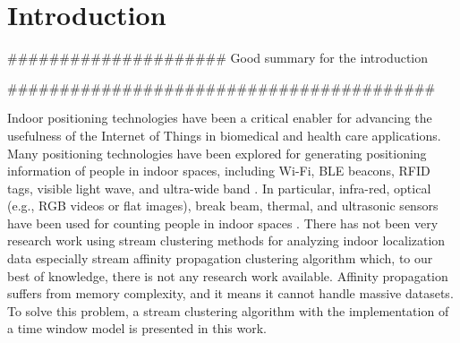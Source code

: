 \setlength{\parindent}{2em}
% 
\chapter{Introduction}

#####################
Good summary for the introduction

#########################################

Indoor positioning technologies have been a critical enabler for advancing the usefulness of the Internet of Things in biomedical and health care applications. Many positioning technologies have been explored for generating positioning information of people in indoor spaces, including Wi-Fi, BLE beacons, RFID tags, visible light wave, and ultra-wide band \cite{namiot2015indoor, jeon2018ble}. In particular, infra-red, optical (e.g., RGB videos or flat images), break beam, thermal, and ultrasonic sensors have been used for counting people in indoor spaces \cite{mautz2012indoor}. There has not been very research work using stream clustering methods for analyzing indoor localization data especially stream affinity propagation clustering algorithm \cite{dueck2009affinity} which, to our best of knowledge, there is not any research work available. Affinity propagation suffers from memory complexity, and it means it cannot handle massive datasets. To solve this problem, a stream clustering algorithm with the implementation of a time window model is presented in this work. 


